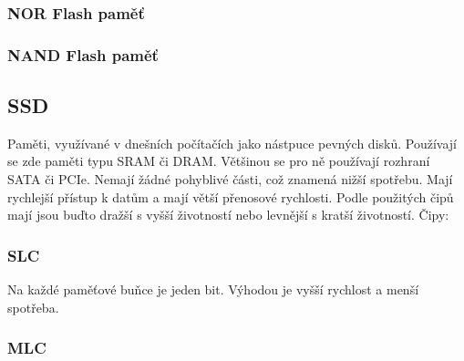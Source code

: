 \subsubsection{NOR Flash paměť}

\subsubsection{NAND Flash paměť}
\subsection{SSD}
Paměti, využívané v dnešních počítačích jako nástpuce pevných disků.
Používají se zde paměti typu SRAM či DRAM.
Většinou se pro ně používají rozhraní SATA či PCIe.
Nemají žádné pohyblivé části, což znamená nižší spotřebu.
Mají rychlejší přístup k datům a mají větší přenosové rychlosti.
Podle použitých čipů mají jsou buďto dražší s vyšší životností nebo levnější s kratší životností.
Čipy:
\subsubsection{SLC}
Na každé paměťové buňce je jeden bit.
Výhodou je vyšší rychlost a menší spotřeba.
\subsubsection{MLC}
